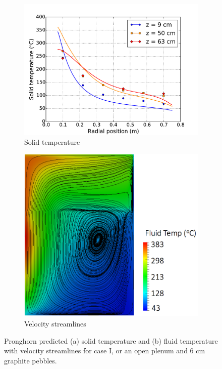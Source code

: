 \begin{figure}[h!]
    \begin{subfigure}{0.5\linewidth}
        \centering
        \includegraphics[height=0.75\linewidth]{figs/piecewise_A3.pdf}
       \caption{Solid temperature}
       \label{fig:plenuma}
    \end{subfigure}
        \begin{subfigure}{0.5\linewidth}
        \centering
        \includegraphics[height=0.75\linewidth]{figs/A3_streamlines.png}
       \caption{Velocity streamlines}
       \label{fig:plenumb}
    \end{subfigure}
    \caption{Pronghorn predicted (a) solid temperature and (b) fluid temperature with velocity streamlines for case I, or an open plenum and 6 \si{\centi\meter} graphite pebbles.}
    \label{fig:plenum}
\end{figure}

